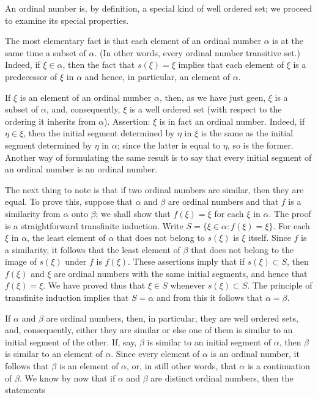 
An ordinal number is, by definition, a special kind of well ordered set; we proceed to examine its special properties. 

The most elementary fact is that each element of an ordinal number $\alpha$ is at the same time a subset of $\alpha$. (In other words, every ordinal number transitive set.) Indeed, if $\xi \in \alpha$, then the fact that $s( \xi ) = \xi$ implies that each element of $\xi$ is a predecessor of $\xi$ in $\alpha$ and hence, in particular, an element of $\alpha$. 

If $\xi$ is an element of an ordinal number $\alpha$, then, as we have just geen, $\xi$ is a subset of $\alpha$, and, consequently, $\xi$ is a well ordered set (with respect to the ordering it inherits from $\alpha$). Assertion: $\xi$ is in fact an ordinal number. Indeed, if $\eta \in \xi$, then the initial segment determined by $\eta$ in $\xi$ is the same as the initial segment determined by $\eta$ in $\alpha$; since the latter is equal to $\eta$, so is the former. Another way of formulating the same result is to say that every initial segment of an ordinal number is an ordinal number. 

The next thing to note is that if two ordinal numbers are similar, then they are equal. To prove this, suppose that $\alpha$ and $\beta$ are ordinal numbers and that $f$ is a similarity from $\alpha$ onto $\beta$; we shall show that $f( \xi ) = \xi$ for each $\xi$ in $\alpha$. The proof is a straightforward transfinite induction. Write $S = \{ \xi \in \alpha : f( \xi ) = \xi \}$. For each $\xi$ in $\alpha$, the least element of $\alpha$ that does not belong to $s( \xi )$ is $\xi$ itself. Since $f$ is a similarity, it follows that the least element of $\beta$ that does not belong to the image of $s( \xi )$ under $f$ is $f( \xi )$. These assertions imply that if $s( \xi ) \subset S$, then $f(\xi )$ and $\xi$ are ordinal numbers with the same initial segments, and hence that $f(\xi ) = \xi$. We have proved thus that $\xi \in S$ whenever  $s( \xi ) \subset S$. The principle of transfinite induction implies that $S = \alpha$ and from this it follows that $\alpha = \beta$.

If $\alpha$ and $\beta$ are ordinal numbers, then, in particular, they are well ordered sets, and, consequently, either they are similar or else one of them is similar to an initial segment of the other. If, say, $\beta$ is similar to an initial segment of $\alpha$, then $\beta$ is similar to an element of $\alpha$. Since every element of $\alpha$ is an ordinal number, it follows that $\beta$ is an element of $\alpha$, or, in still other words, that $\alpha$ is a continuation of $\beta$. We know by now that if $\alpha$ and $\beta$ are distinct ordinal numbers, then the statements 

